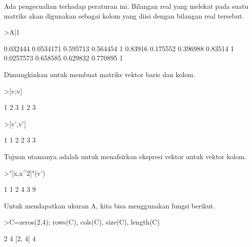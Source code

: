 \documentclass{article}
\begin{document}
\begin{eulernotebook}
\begin{eulercomment}
\begin{eulercomment}
\begin{eulercomment}
\begin{eulercomment}
\begin{eulercomment}
\begin{eulercomment}
\begin{eulercomment}
Ada pengecualian terhadap peraturan ini. Bilangan real yang melekat
pada suatu matriks akan digunakan sebagai kolom yang diisi dengan
bilangan real tersebut.
\end{eulercomment}
\begin{eulerprompt}
>A|1
\end{eulerprompt}
\begin{euleroutput}
       0.032444     0.0534171      0.595713      0.564454             1 
        0.83916      0.175552      0.396988       0.83514             1 
      0.0257573      0.658585      0.629832      0.770895             1 
\end{euleroutput}
\begin{eulercomment}
Dimungkinkan untuk membuat matriks vektor baris dan kolom.
\end{eulercomment}
\begin{eulerprompt}
>[v;v]
\end{eulerprompt}
\begin{euleroutput}
              1             2             3 
              1             2             3 
\end{euleroutput}
\begin{eulerprompt}
>[v',v']
\end{eulerprompt}
\begin{euleroutput}
              1             1 
              2             2 
              3             3 
\end{euleroutput}
\begin{eulercomment}
Tujuan utamanya adalah untuk menafsirkan ekspresi vektor untuk vektor
kolom.
\end{eulercomment}
\begin{eulerprompt}
>"[x,x^2]"(v')
\end{eulerprompt}
\begin{euleroutput}
              1             1 
              2             4 
              3             9 
\end{euleroutput}
\begin{eulercomment}
Untuk mendapatkan ukuran A, kita bisa menggunakan fungsi berikut.
\end{eulercomment}
\begin{eulerprompt}
>C=zeros(2,4); rows(C), cols(C), size(C), length(C)
\end{eulerprompt}
\begin{euleroutput}
  2
  4
  [2,  4]
  4
\end{euleroutput}
\begin{eulercomment}

\end{eulercomment}
\end{eulercomment}
\end{eulercomment}
\end{eulercomment}
\end{eulercomment}
\end{eulercomment}
\end{eulercomment}
\end{eulernotebook}
\end{document}
